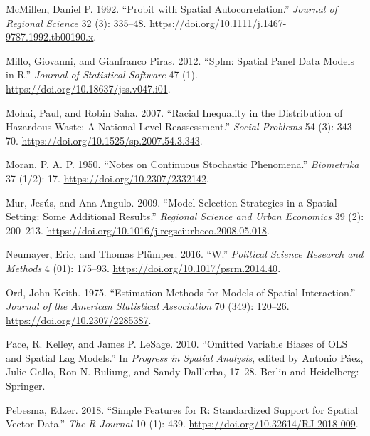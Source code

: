 \documentclass[
  letterpaper,
  DIV=11,
  numbers=noendperiod]{scrreprt}
\newlength{\cslhangindent}
\newlength{\cslentryspacingunit} %
\newenvironment{CSLReferences}[2] %
 {%
  \setlength{\parindent}{0pt}
  \ifodd #1
  \let\oldpar\par
  \def\par{\hangindent=\cslhangindent\oldpar}
  \fi
  \setlength{\parskip}{#2\cslentryspacingunit}
 }%
 {}
\begin{document}
\begin{CSLReferences}{1}{0}
\leavevmode{}%
McMillen, Daniel P. 1992. {``Probit with {Spatial Autocorrelation}.''}
\emph{Journal of Regional Science} 32 (3): 335--48.
\url{https://doi.org/10.1111/j.1467-9787.1992.tb00190.x}.

\leavevmode{}%
Millo, Giovanni, and Gianfranco Piras. 2012. {``Splm: {Spatial Panel
Data Models} in {R}.''} \emph{Journal of Statistical Software} 47 (1).
\url{https://doi.org/10.18637/jss.v047.i01}.

\leavevmode{}%
Mohai, Paul, and Robin Saha. 2007. {``Racial {Inequality} in the
{Distribution} of {Hazardous Waste}: {A National-Level Reassessment}.''}
\emph{Social Problems} 54 (3): 343--70.
\url{https://doi.org/10.1525/sp.2007.54.3.343}.

\leavevmode{}%
Moran, P. A. P. 1950. {``Notes on {Continuous Stochastic Phenomena}.''}
\emph{Biometrika} 37 (1/2): 17. \url{https://doi.org/10.2307/2332142}.

\leavevmode{}%
Mur, Jesús, and Ana Angulo. 2009. {``Model {Selection Strategies} in a
{Spatial Setting}: {Some Additional Results}.''} \emph{Regional Science
and Urban Economics} 39 (2): 200--213.
\url{https://doi.org/10.1016/j.regsciurbeco.2008.05.018}.

\leavevmode{}%
Neumayer, Eric, and Thomas Plümper. 2016. {``W.''} \emph{Political
Science Research and Methods} 4 (01): 175--93.
\url{https://doi.org/10.1017/psrm.2014.40}.

\leavevmode{}%
Ord, John Keith. 1975. {``Estimation {Methods} for {Models} of {Spatial
Interaction}.''} \emph{Journal of the American Statistical Association}
70 (349): 120--26. \url{https://doi.org/10.2307/2285387}.

\leavevmode{}%
Pace, R. Kelley, and James P. LeSage. 2010. {``Omitted {Variable Biases}
of {OLS} and {Spatial Lag Models}.''} In \emph{Progress in {Spatial
Analysis}}, edited by Antonio Páez, Julie Gallo, Ron N. Buliung, and
Sandy Dall'erba, 17--28. {Berlin and Heidelberg}: {Springer}.

\leavevmode{}%
Pebesma, Edzer. 2018. {``Simple Features for {R}: {Standardized} Support
for Spatial Vector Data.''} \emph{The R Journal} 10 (1): 439.
\url{https://doi.org/10.32614/RJ-2018-009}.


\end{CSLReferences}
\end{document}
